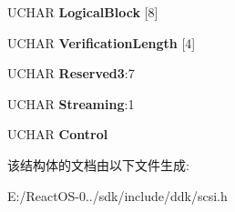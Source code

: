 \begin{DoxyCompactItemize}
U\+C\+H\+AR {\bfseries Logical\+Block} \mbox{[}8\mbox{]}
\item 
\mbox{\label{struct___c_d_b_1_1___v_e_r_i_f_y16_a84a725bc57b7d3828416a014b60bf506}} 
U\+C\+H\+AR {\bfseries Verification\+Length} \mbox{[}4\mbox{]}
\item 
\mbox{\label{struct___c_d_b_1_1___v_e_r_i_f_y16_a85b5d1bf4470427cc6913612da743784}} 
U\+C\+H\+AR {\bfseries Reserved3}\+:7
\item 
\mbox{\label{struct___c_d_b_1_1___v_e_r_i_f_y16_a791091ab0ca288549bbd63a8ca8f3bc7}} 
U\+C\+H\+AR {\bfseries Streaming}\+:1
\item 
\mbox{\label{struct___c_d_b_1_1___v_e_r_i_f_y16_a3d103be0a92fbac38cfc54d16d5dc121}} 
U\+C\+H\+AR {\bfseries Control}
\end{DoxyCompactItemize}


该结构体的文档由以下文件生成\+:\begin{DoxyCompactItemize}
\item 
E\+:/\+React\+O\+S-\/0../sdk/include/ddk/scsi.\+h\end{DoxyCompactItemize}
